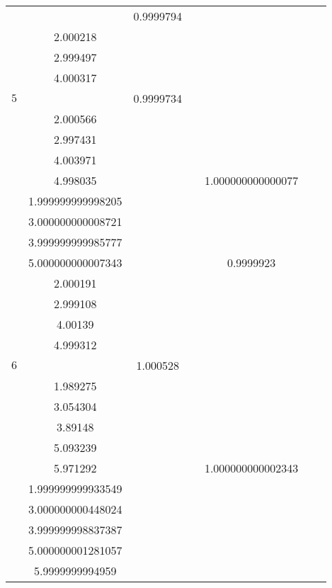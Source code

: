 \documentclass[oneside, final, 12pt]{extarticle}
\begin{document}
\begin{longtable}{|c|c|c|c|c|c|c|}
& \( \begin{aligned}
& 0.9999794 \\ & 2.000218 \\ & 2.999497 \\ & 4.000317 
\end{aligned} \)
& \( \begin{aligned}  \end{aligned} \) 
\\ \hline
    \(5\) & \( \begin{aligned}
& 0.9999734 \\ & 2.000566 \\ & 2.997431 \\ & 4.003971 \\ & 4.998035 
\end{aligned} \)
& \( \begin{aligned}  \end{aligned} \) 
& \( \begin{aligned}
& 1.000000000000077 \\ & 1.999999999998205 \\ & 3.000000000008721 \\ & 3.999999999985777 \\ & 5.000000000007343 
\end{aligned} \)
& \( \begin{aligned}  \end{aligned} \) 
& \( \begin{aligned}
& 0.9999923 \\ & 2.000191 \\ & 2.999108 \\ & 4.00139 \\ & 4.999312 
\end{aligned} \)
& \( \begin{aligned}  \end{aligned} \) 
\\ \hline
    \(6\) & \( \begin{aligned}
& 1.000528 \\ & 1.989275 \\ & 3.054304 \\ & 3.89148 \\ & 5.093239 \\ & 5.971292 
\end{aligned} \)
& \( \begin{aligned}  \end{aligned} \) 
& \( \begin{aligned}
& 1.000000000002343 \\ & 1.999999999933549 \\ & 3.000000000448024 \\ & 3.999999998837387 \\ & 5.000000001281057 \\ & 5.9999999994959 

\end{aligned}
\end{longtable}
\end{document}
